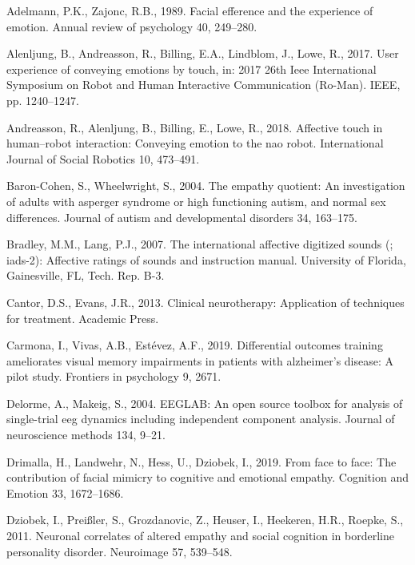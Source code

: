 \documentclass[]{elsarticle} %
\begin{document}
\leavevmode\hypertarget{ref-adelmann1989facial}{}%
Adelmann, P.K., Zajonc, R.B., 1989. Facial efference and the experience
of emotion. Annual review of psychology 40, 249--280.

\leavevmode\hypertarget{ref-alenljung2017user}{}%
Alenljung, B., Andreasson, R., Billing, E.A., Lindblom, J., Lowe, R.,
2017. User experience of conveying emotions by touch, in: 2017 26th Ieee
International Symposium on Robot and Human Interactive Communication
(Ro-Man). IEEE, pp. 1240--1247.

\leavevmode\hypertarget{ref-andreasson2018affective}{}%
Andreasson, R., Alenljung, B., Billing, E., Lowe, R., 2018. Affective
touch in human--robot interaction: Conveying emotion to the nao robot.
International Journal of Social Robotics 10, 473--491.

\leavevmode\hypertarget{ref-baron2004empathy}{}%
Baron-Cohen, S., Wheelwright, S., 2004. The empathy quotient: An
investigation of adults with asperger syndrome or high functioning
autism, and normal sex differences. Journal of autism and developmental
disorders 34, 163--175.

\leavevmode\hypertarget{ref-bradley2007international}{}%
Bradley, M.M., Lang, P.J., 2007. The international affective digitized
sounds (; iads-2): Affective ratings of sounds and instruction manual.
University of Florida, Gainesville, FL, Tech. Rep. B-3.

\leavevmode\hypertarget{ref-cantor2013clinical}{}%
Cantor, D.S., Evans, J.R., 2013. Clinical neurotherapy: Application of
techniques for treatment. Academic Press.

\leavevmode\hypertarget{ref-carmona2019differential}{}%
Carmona, I., Vivas, A.B., Estévez, A.F., 2019. Differential outcomes
training ameliorates visual memory impairments in patients with
alzheimer's disease: A pilot study. Frontiers in psychology 9, 2671.

\leavevmode\hypertarget{ref-delorme2004eeglab}{}%
Delorme, A., Makeig, S., 2004. EEGLAB: An open source toolbox for
analysis of single-trial eeg dynamics including independent component
analysis. Journal of neuroscience methods 134, 9--21.

\leavevmode\hypertarget{ref-drimalla2019face}{}%
Drimalla, H., Landwehr, N., Hess, U., Dziobek, I., 2019. From face to
face: The contribution of facial mimicry to cognitive and emotional
empathy. Cognition and Emotion 33, 1672--1686.

\leavevmode\hypertarget{ref-dziobek2011neuronal}{}%
Dziobek, I., Preißler, S., Grozdanovic, Z., Heuser, I., Heekeren, H.R.,
Roepke, S., 2011. Neuronal correlates of altered empathy and social
cognition in borderline personality disorder. Neuroimage 57, 539--548.
\end{document}
